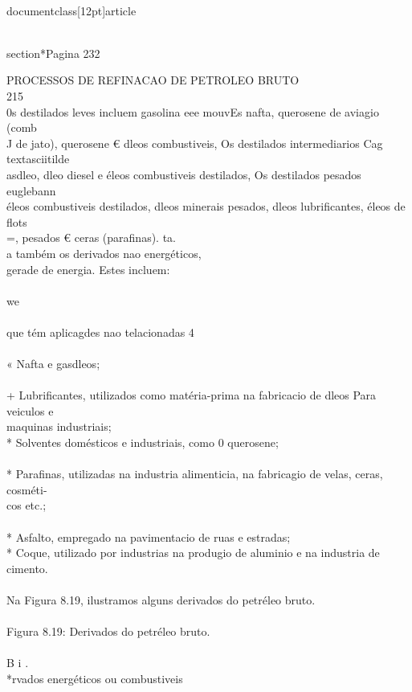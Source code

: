 \\documentclass[12pt]{article}
\begin{document}
\\section*{Pagina 232}

PROCESSOS DE REFINACAO DE PETROLEO BRUTO\\
215\\
0s destilados leves incluem gasolina eee mouvEs nafta, querosene de aviagio (comb\\
J de jato), querosene € dleos combustiveis, Os destilados intermediarios Cag \\textasciitilde{}\\
asdleo, dleo diesel e éleos combustiveis destilados, Os destilados pesados euglebann\\
éleos combustiveis destilados, dleos minerais pesados, dleos lubrificantes, éleos de flots\\
=, pesados € ceras (parafinas). ta.\\
a também os derivados nao energéticos,\\
gerade de energia. Estes incluem:\\
\\
we\\
\\
que tém aplicagdes nao telacionadas 4\\
\\
« Nafta e gasdleos;\\
\\
+ Lubrificantes, utilizados como matéria-prima na fabricacio de dleos Para veiculos e\\
maquinas industriais;\\
* Solventes domésticos e industriais, como 0 querosene;\\
\\
* Parafinas, utilizadas na industria alimenticia, na fabricagio de velas, ceras, cosméti-\\
cos etc.;\\
\\
* Asfalto, empregado na pavimentacio de ruas e estradas;\\
* Coque, utilizado por industrias na produgio de aluminio e na industria de cimento.\\
\\
Na Figura 8.19, ilustramos alguns derivados do petréleo bruto.\\
\\
Figura 8.19: Derivados do petréleo bruto.\\
\\
B i .\\
*rvados energéticos ou combustiveis\\
\end{document}
